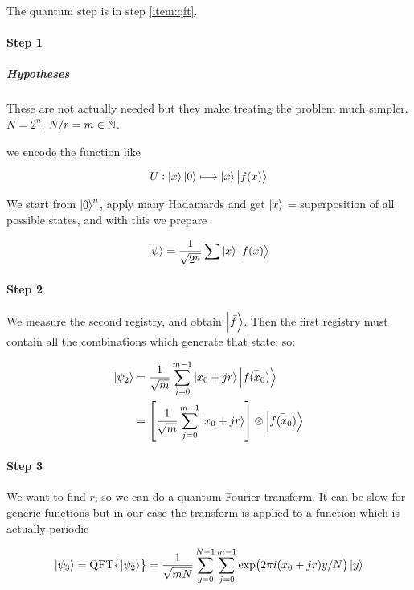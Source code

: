 The quantum step is in step \ref{item:qft}.


\paragraph{Step 1}

\subparagraph{Hypotheses} These are not actually needed but they make treating the problem much simpler. \( N = 2^n \), \( N/r = m \in \mathbb{N} \).

we encode the function like

\begin{equation}
   U: \ket{x}\ket{0} \longmapsto \ket{x} \ket{f(x)}
\end{equation}

We start from \( \ket{0}^n \), apply many Hadamards and get \( \ket{x} \) = superposition of all possible states, and with this
we prepare

\begin{equation}
  \ket{\psi} = \frac{1}{\sqrt{2^n}} \sum \ket{x} \ket{f(x)}
\end{equation}

\paragraph{Step 2}

We measure the second registry, and obtain \( \ket{\bar{f}} \). Then the first registry must contain all the combinations which generate that state: so:

\begin{align}
  \ket{\psi_2}
  &= \frac{1}{\sqrt{m}}\sum _{j=0} ^{m-1} \ket{x_0 + jr} \ket{\bar{f(x_0)}}  \\
  &= \qty[\frac{1}{\sqrt{m}}\sum _{j=0} ^{m-1} \ket{x_0 + jr} ] \otimes \ket{\bar{f(x_0)}}
\end{align}

\paragraph{Step 3}

We want to find \( r \), so we can do a quantum Fourier transform. It can be slow for generic functions but in our case the transform is applied to a function which is actually periodic

\begin{equation}
  \ket{\psi _3} = \text{QFT}\qty{\ket{\psi_2}} = \frac{1}{\sqrt{mN}} \sum _{y=0} ^{N-1} \sum _{j=0} ^{m-1} \exp(2 \pi i (x_0 + jr) y/N) \ket{y}
\end{equation}

